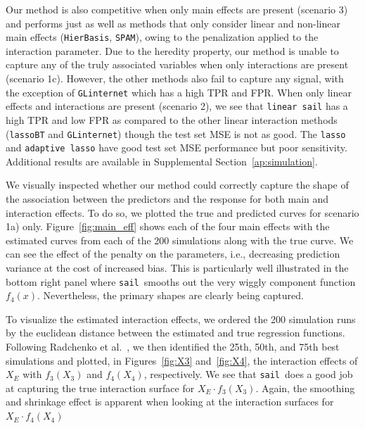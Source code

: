 \documentclass[12pt,letter]{article}\usepackage[]{graphicx}\usepackage[]{color}
\newcommand{\sail}{\texttt{sail}}
\begin{document}
Our method is also competitive when only main effects are present (scenario 3) and performs just as well as methods that only consider linear and non-linear main effects (\texttt{HierBasis}, \texttt{SPAM}), owing to the penalization applied to the interaction parameter. Due to the heredity property, our method is unable to capture any of the truly associated variables when only interactions are present (scenario 1c). However, the other methods also fail to capture any signal, with the exception of \texttt{GLinternet} which has a high TPR and FPR. When only linear effects and interactions are present (scenario 2), we see that \texttt{linear sail} has a high TPR and low FPR as compared to the other linear interaction methods (\texttt{lassoBT} and \texttt{GLinternet}) though the test set MSE is not as good. The \texttt{lasso} and \texttt{adaptive lasso} have good test set MSE performance but poor sensitivity. Additional results are available in Supplemental Section~\ref{ap:simulation}. %

We visually inspected whether our method could correctly capture the shape of the association between the predictors and the response for both main and interaction effects. To do so, we plotted the true and predicted curves for scenario 1a) only. Figure~\ref{fig:main_eff} shows each of the four main effects with the estimated curves from each of the 200 simulations along with the true curve. We can see the effect of the penalty on the parameters, i.e., decreasing prediction variance at the cost of increased bias. This is particularly well illustrated in the bottom right panel where \sail ~smooths out the very wiggly component function $f_4(x)$. Nevertheless, the primary shapes are clearly being captured.

To visualize the estimated interaction effects, we ordered the 200 simulation runs by the euclidean distance between the estimated and true regression functions. Following Radchenko et al.~\citep{radchenko2010variable}, we then identified the 25th, 50th, and 75th best simulations and plotted, in Figures~\ref{fig:X3} and~\ref{fig:X4}, the interaction effects of $X_E$ with $f_3(X_3)$ and $f_4(X_4)$, respectively. We see that \sail ~does a good job at capturing the true interaction surface for $X_E \cdot f_3(X_3)$. Again, the smoothing and shrinkage effect is apparent when looking at the interaction surfaces for $X_E \cdot f_4(X_4)$
\end{document}

